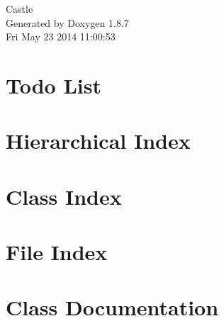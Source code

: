 \documentclass[twoside]{book}
\newcommand{\+}{\discretionary{\mbox{\scriptsize$\hookleftarrow$}}{}{}}
\newcommand{\clearemptydoublepage}{%
  \newpage{\pagestyle{empty}\cleardoublepage}%
}
\begin{document}
\hypersetup{pageanchor=false,
             bookmarks=true,
             bookmarksnumbered=true,
             pdfencoding=unicode
            }
\begin{titlepage}
\vspace*{7cm}
\begin{center}%
{\Large Castle }\\
\vspace*{1cm}
{\large Generated by Doxygen 1.8.7}\\
\vspace*{0.5cm}
{\small Fri May 23 2014 11:00:53}\\
\end{center}
\end{titlepage}
\clearemptydoublepage
\tableofcontents
\clearemptydoublepage
{}
\hypersetup{pageanchor=true}

\chapter{Todo List}
\label{todo}
\hypertarget{todo}{}

\chapter{Hierarchical Index}

\chapter{Class Index}

\chapter{File Index}

\chapter{Class Documentation}






















\end{document}
